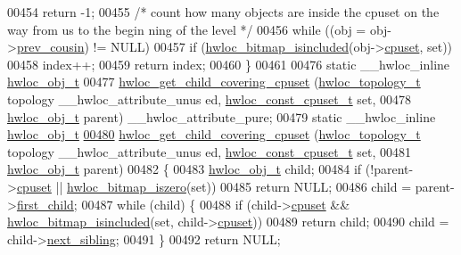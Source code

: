 \begin{DoxyCode}
00454     \textcolor{keywordflow}{return} -1;
00455   \textcolor{comment}{/* count how many objects are inside the cpuset on the way from us to the begin
      ning of the level */}
00456   \textcolor{keywordflow}{while} ((obj = obj->\hyperlink{a00016_ac715989f55ff5a0eb6be2969ee477ec0}{prev_cousin}) != NULL)
00457     \textcolor{keywordflow}{if} (\hyperlink{a00065_gaae29e14a926c198e8f91e6e4790621e7}{hwloc_bitmap_isincluded}(obj->\hyperlink{a00016_a67925e0f2c47f50408fbdb9bddd0790f}{cpuset}, \textcolor{keyword}{set}))
00458       index++;
00459   \textcolor{keywordflow}{return} index;
00460 \}
00461 
00476 \textcolor{keyword}{static} \_\_hwloc\_inline \hyperlink{a00016}{hwloc_obj_t}
00477 \hyperlink{a00055_ga69a22cc76c88115aee7b7e6fc53fca7d}{hwloc_get_child_covering_cpuset} (\hyperlink{a00039_ga9d1e76ee15a7dee158b786c30b6a6e38}{hwloc_topology_t} topology \_\_hwloc\_attribute\_unus
      ed, \hyperlink{a00040_ga1f784433e9b606261f62d1134f6a3b25}{hwloc_const_cpuset_t} \textcolor{keyword}{set},
00478                                 \hyperlink{a00016}{hwloc_obj_t} parent) \_\_hwloc\_attribute\_pure;
00479 \textcolor{keyword}{static} \_\_hwloc\_inline \hyperlink{a00016}{hwloc_obj_t}
\hypertarget{a00031_source_l00480}{}\hyperlink{a00055_ga69a22cc76c88115aee7b7e6fc53fca7d}{00480} \hyperlink{a00055_ga69a22cc76c88115aee7b7e6fc53fca7d}{hwloc_get_child_covering_cpuset} (\hyperlink{a00039_ga9d1e76ee15a7dee158b786c30b6a6e38}{hwloc_topology_t} topology \_\_hwloc\_attribute\_unus
      ed, \hyperlink{a00040_ga1f784433e9b606261f62d1134f6a3b25}{hwloc_const_cpuset_t} \textcolor{keyword}{set},
00481                                 \hyperlink{a00016}{hwloc_obj_t} parent)
00482 \{
00483   \hyperlink{a00016}{hwloc_obj_t} child;
00484   \textcolor{keywordflow}{if} (!parent->\hyperlink{a00016_a67925e0f2c47f50408fbdb9bddd0790f}{cpuset} || \hyperlink{a00065_gaa94fed35d2a598bc4a8657b6955b7bf5}{hwloc_bitmap_iszero}(\textcolor{keyword}{set}))
00485     \textcolor{keywordflow}{return} NULL;
00486   child = parent->\hyperlink{a00016_af51d08a0a79dba517c06c5afedc8d2dc}{first_child};
00487   \textcolor{keywordflow}{while} (child) \{
00488     \textcolor{keywordflow}{if} (child->\hyperlink{a00016_a67925e0f2c47f50408fbdb9bddd0790f}{cpuset} && \hyperlink{a00065_gaae29e14a926c198e8f91e6e4790621e7}{hwloc_bitmap_isincluded}(\textcolor{keyword}{set}, child->\hyperlink{a00016_a67925e0f2c47f50408fbdb9bddd0790f}{cpuset}))
00489       \textcolor{keywordflow}{return} child;
00490     child = child->\hyperlink{a00016_a7f2343ed476fe4942e6fffd4cade1b40}{next_sibling};
00491   \}
00492   \textcolor{keywordflow}{return} NULL;

\end{DoxyCode}
